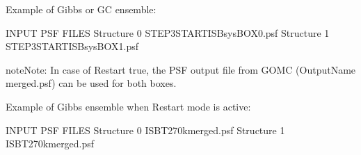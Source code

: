 \documentclass[letterpaper,10pt,english]{sphinxmanual}
\begin{document}
\begin{description}
Example of Gibbs or GC ensemble:

%
\begin{sphinxVerbatim}[commandchars=\\\{\}]
\PYGZsh{}\PYGZsh{}\PYGZsh{}\PYGZsh{}\PYGZsh{}\PYGZsh{}\PYGZsh{}\PYGZsh{}\PYGZsh{}\PYGZsh{}\PYGZsh{}\PYGZsh{}\PYGZsh{}\PYGZsh{}\PYGZsh{}\PYGZsh{}\PYGZsh{}\PYGZsh{}\PYGZsh{}\PYGZsh{}\PYGZsh{}\PYGZsh{}\PYGZsh{}\PYGZsh{}\PYGZsh{}\PYGZsh{}\PYGZsh{}\PYGZsh{}\PYGZsh{}\PYGZsh{}\PYGZsh{}\PYGZsh{}\PYGZsh{}
\PYGZsh{} INPUT PSF FILES
\PYGZsh{}\PYGZsh{}\PYGZsh{}\PYGZsh{}\PYGZsh{}\PYGZsh{}\PYGZsh{}\PYGZsh{}\PYGZsh{}\PYGZsh{}\PYGZsh{}\PYGZsh{}\PYGZsh{}\PYGZsh{}\PYGZsh{}\PYGZsh{}\PYGZsh{}\PYGZsh{}\PYGZsh{}\PYGZsh{}\PYGZsh{}\PYGZsh{}\PYGZsh{}\PYGZsh{}\PYGZsh{}\PYGZsh{}\PYGZsh{}\PYGZsh{}\PYGZsh{}\PYGZsh{}\PYGZsh{}\PYGZsh{}\PYGZsh{}
Structure 0 STEP3\PYGZus{}START\PYGZus{}ISB\PYGZus{}sys\PYGZus{}BOX\PYGZus{}0.psf
Structure 1 STEP3\PYGZus{}START\PYGZus{}ISB\PYGZus{}sys\PYGZus{}BOX\PYGZus{}1.psf
\end{sphinxVerbatim}

\begin{sphinxadmonition}{note}{Note:}
In case of Restart true, the PSF output file from GOMC (OutputName merged.psf) can be used for both boxes.
\end{sphinxadmonition}

Example of Gibbs ensemble when Restart mode is active:

%
\begin{sphinxVerbatim}[commandchars=\\\{\}]
\PYGZsh{}\PYGZsh{}\PYGZsh{}\PYGZsh{}\PYGZsh{}\PYGZsh{}\PYGZsh{}\PYGZsh{}\PYGZsh{}\PYGZsh{}\PYGZsh{}\PYGZsh{}\PYGZsh{}\PYGZsh{}\PYGZsh{}\PYGZsh{}\PYGZsh{}\PYGZsh{}\PYGZsh{}\PYGZsh{}\PYGZsh{}\PYGZsh{}\PYGZsh{}\PYGZsh{}\PYGZsh{}\PYGZsh{}\PYGZsh{}\PYGZsh{}\PYGZsh{}\PYGZsh{}\PYGZsh{}\PYGZsh{}\PYGZsh{}
\PYGZsh{} INPUT PSF FILES
\PYGZsh{}\PYGZsh{}\PYGZsh{}\PYGZsh{}\PYGZsh{}\PYGZsh{}\PYGZsh{}\PYGZsh{}\PYGZsh{}\PYGZsh{}\PYGZsh{}\PYGZsh{}\PYGZsh{}\PYGZsh{}\PYGZsh{}\PYGZsh{}\PYGZsh{}\PYGZsh{}\PYGZsh{}\PYGZsh{}\PYGZsh{}\PYGZsh{}\PYGZsh{}\PYGZsh{}\PYGZsh{}\PYGZsh{}\PYGZsh{}\PYGZsh{}\PYGZsh{}\PYGZsh{}\PYGZsh{}\PYGZsh{}\PYGZsh{}
Structure 0 ISB\PYGZus{}T\PYGZus{}270\PYGZus{}k\PYGZus{}merged.psf
Structure 1 ISB\PYGZus{}T\PYGZus{}270\PYGZus{}k\PYGZus{}merged.psf
\end{sphinxVerbatim}

\end{description}
\end{document}
